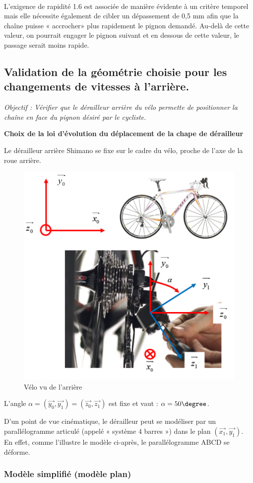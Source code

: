 ~\ \\
L'exigence de rapidité 1.6 est associée de manière évidente à un critère temporel mais elle nécessite également de cibler un dépassement de 0,5 mm afin que la chaîne puisse « accrocher» plus rapidement le pignon demandé. Au-delà de cette valeur, on pourrait engager le pignon suivant et en dessous de cette valeur, le passage serait moins rapide. 

\subsection{Validation de la géométrie choisie pour les changements de vitesses à l'arrière.}

\textit{Objectif : Vérifier que le dérailleur arrière du vélo permette de positionner la chaîne en face du pignon désiré par le cycliste.}

\textbf{Choix de la loi d'évolution du déplacement de la chape de dérailleur}

Le dérailleur arrière Shimano se fixe sur le cadre du vélo, proche de l'axe de la roue arrière.

\begin{figure}[!h]
 \centering\includegraphics[width=0.5\linewidth]{img/img03}
 \caption{Vélo vu de l'arrière}
 \label{img03}
\end{figure}

L'angle $\alpha=(\overrightarrow{y_0},\overrightarrow{y_1})=(\overrightarrow{z_0},\overrightarrow{z_1})$ est fixe et vaut : $\alpha=50\degree$.

D'un point de vue cinématique, le dérailleur peut se modéliser par un parallélogramme articulé (appelé « système 4 barres ») dans le plan $(\overrightarrow{x_1},\overrightarrow{y_1})$. En effet, comme l'illustre le modèle ci-après, le parallélogramme ABCD se déforme.

\subsubsection{Modèle simplifié (modèle plan)}

